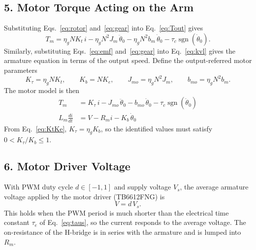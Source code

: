 \documentclass[a4paper,11pt]{article}
\newcommand{\sgn}{\operatorname{sgn}}
\begin{document}
\subsection{5. Motor Torque Acting on the Arm}
Substituting Eqs.~\eqref{eq:rotor} and~\eqref{eq:gear} into Eq.~\eqref{eq:Tout} gives
\begin{equation}
  T_m = \eta_g N K_t\, i - \eta_g N^2 J_m\, \ddot\theta_0 - \eta_g N^2 b_m\, \dot\theta_0 - \tau_c \sgn(\dot\theta_0) .
\end{equation}
Similarly, substituting Eqs.~\eqref{eq:emf} and~\eqref{eq:gear} into Eq.~\eqref{eq:kvl} gives the armature equation in terms of the output speed. Define the output-referred motor parameters
\begin{equation}
  K_\tau = \eta_g N K_t, \qquad K_b = N K_e, \qquad J_{mo} = \eta_g N^2 J_m, \qquad b_{mo} = \eta_g N^2 b_m .
  \label{eq:outref}
\end{equation}
The motor model is then
\begin{equation}
\boxed{
\begin{aligned}
  T_m &= K_\tau\, i - J_{mo}\, \ddot\theta_0 - b_{mo}\, \dot\theta_0 - \tau_c \sgn(\dot\theta_0)\\
  L_m \frac{di}{dt} &= V - R_m i - K_b\, \dot\theta_0
\end{aligned}
}
\label{eq:motor}
\end{equation}
From Eq.~\eqref{eq:KtKe}, $K_\tau = \eta_g K_b$, so the identified values must satisfy $0 < K_\tau / K_b \le 1$.

\subsection{6. Motor Driver Voltage}
With PWM duty cycle $d \in [-1, 1]$ and supply voltage $V_s$, the average armature voltage applied by the motor driver (TB6612FNG) is
\begin{equation}
  V = d\, V_s .
  \label{eq:duty}
\end{equation}
This holds when the PWM period is much shorter than the electrical time constant $\tau_e$ of Eq.~\eqref{eq:taus}, so the current responds to the average voltage. The on-resistance of the H-bridge is in series with the armature and is lumped into $R_m$.
\end{document}
